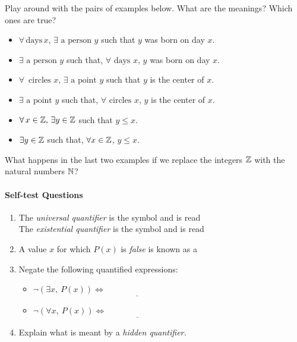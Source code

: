  Play around with the pairs of examples below. What are the meanings? Which ones are true? 
\begin{itemize}\setlength{\itemsep}{0cm}
\item $\forall\,\text{days}\,x,\,\exists\text{ a person }y$ such that $y$ was born on day $x$.
\item $\exists\text{ a person }y$ such that, $\forall\text{ days }x$, $y$ was born on day $x$.\\
\item $\forall\,\text{ circles }x,\,\exists\text{ a point }y$ such that $y$ is the center of $x$.
\item $\exists\text{ a point }y$ such that, $\forall\text{ circles }x$, $y$ is the center of $x$.\\
\item $\forall\,x\in\mathbb{Z},\,\exists y\in\mathbb{Z}$ such that $y\le x$.
\item $\exists y\in\mathbb{Z}$ such that, $\forall x\in\mathbb{Z}$, $y\le x$.
\end{itemize}
What happens in the last two examples if we replace the integers $\mathbb{Z}$ with the natural numbers $\mathbb{N}$?


\paragraph{Self-test Questions}

\begin{enumerate}
  \item The \emph{universal quantifier} is the symbol \underline{\phantom{$\forall$}\qquad} and is read \underline{\phantom{for all}\qquad\qquad}\\
  The \emph{existential quantifier} is the symbol \underline{\phantom{$\exists$}\qquad} and is read \underline{\phantom{there exists}\qquad\qquad}
  \item A value $x$ for which $P(x)$ is \emph{false} is known as a \underline{\phantom{counterexample}\qquad\qquad}
  \item Negate the following quantified expressions:
  \begin{itemize}
    \item $\neg(\exists x,\ P(x))\iff\underline{\phantom{\forall x,\ \neg P(x)\qquad}}$
    \item $\neg(\forall x,\ P(x))\iff\underline{\phantom{\exists x,\ \neg P(x)\qquad}}$
  \end{itemize}
  \item Explain what is meant by a \emph{hidden quantifier.}
\end{enumerate}

